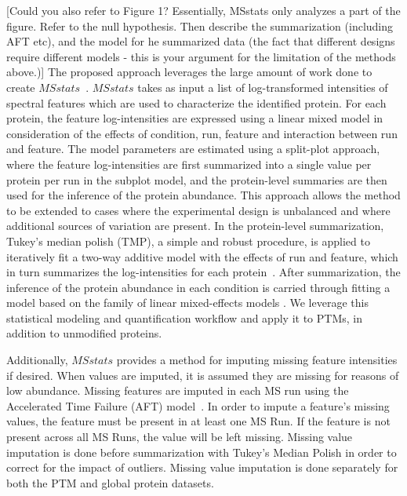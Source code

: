 \documentclass[mcp]{article}
\numberwithin{table}{section}
\def\todo#1{{\color{red}[#1]}}
\begin{document}
\todo{Could you also refer to Figure 1? Essentially, MSstats only analyzes a part of the figure. Refer to the null hypothesis. Then describe the summarization (including AFT etc), and the model for he summarized data (the fact that different designs require different models - this is your argument for the limitation of the methods above.)} The proposed approach leverages the large amount of work done to create $MSstats$~\cite{Choi:2014}. $MSstats$ takes as input a list of log-transformed intensities of spectral features which are used to characterize the identified protein. For each protein, the feature log-intensities are expressed using a linear mixed model in consideration of the effects of condition, run, feature and interaction between run and feature. The model parameters are estimated using a split-plot approach, where the feature log-intensities are first summarized into a single value per protein per run in the subplot model, and the protein-level summaries are then used for the inference of the protein abundance. This approach allows the method to be extended to cases where the experimental design is unbalanced and where additional sources of variation are present. In the protein-level summarization, Tukey's median polish (TMP), a simple and robust procedure, is applied to iteratively fit a two-way additive model with the effects of run and feature, which in turn summarizes the log-intensities for each protein~\cite{Tukey:1977}. After summarization, the inference of the protein abundance in each condition is carried through fitting a model based on the family of linear mixed-effects models \cite{Bolker2009} \cite{Faraway:2006}. We leverage this statistical modeling and quantification workflow and apply it to PTMs, in addition to unmodified proteins.

Additionally, $MSstats$ provides a method for imputing missing feature intensities if desired. When values are imputed, it is assumed they are missing for reasons of low abundance. Missing features are imputed in each MS run using the Accelerated Time Failure (AFT) model~\cite{Tukey:1977}. In order to impute a feature's missing values, the feature must be present in at least one MS Run. If the feature is not present across all MS Runs, the value will be left missing. Missing value imputation is done before summarization with Tukey's Median Polish in order to correct for the impact of outliers. Missing value imputation is done separately for both the PTM and global protein datasets.

\end{document}

